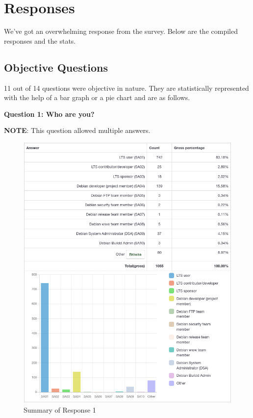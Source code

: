 \documentclass{article}
\begin{document}
\vspace{3mm}
\section{Responses}

\vspace{3mm}
We've got an overwhelming response from the survey. Below are the compiled responses and the stats.

\vspace{3mm}
\subsection{Objective Questions}

\vspace{3mm}
11 out of 14 questions were objective in nature. They are statistically represented with the help
of a bar graph or a pie chart and are as follows.

\newpage

\Large{\textbf{Question 1: Who are you?}}

\vspace{4mm}
\large{\textbf{NOTE}: This question allowed multiple answers.}
\vspace{1mm}
\begin{figure}[h!]
\centering
\includegraphics[width=16.5cm]{assets/1-complete-responses.png}
\caption{Summary of Response 1}
\end{figure}
\end{document}
